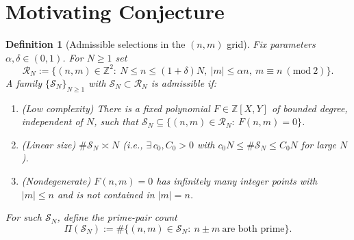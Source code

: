 \documentclass[11pt]{article}
\theoremstyle{inline}
\theoremstyle{break}
\theoremstyle{break}
\theoremstyle{break}
\theoremstyle{break}
\theoremstyle{break}
\theoremstyle{break}
\theoremstyle{break}
\newtheorem{definition}{Definition}
\theoremstyle{inline}
\begin{document}
\appendix
{}  %

\section{Motivating Conjecture}\label{app:motivation}

\begin{definition}[Admissible selections in the \( (n,m) \) grid]
\label{def:admissible}
Fix parameters \( \alpha,\delta\in(0,1) \). For \( N\ge 1 \) set
\begin{equation}
\mathcal{R}_N:=\{(n,m)\in\mathbb{Z}^2:\ N\le n\le (1+\delta)N,\ |m|\le \alpha n,\ m\equiv n \ (\mathrm{mod}\ 2)\}.
\end{equation}
A family \( \{\mathcal{S}_N\}_{N\ge 1} \) with \( \mathcal{S}_N\subset\mathcal{R}_N \) is \emph{admissible} if:
\begin{enumerate}
\item[(A1)] (\emph{Low complexity}) There is a fixed polynomial \( F\in\mathbb{Z}[X,Y] \) of bounded degree, independent of \( N \), such that
\( \mathcal{S}_N \subseteq \{(n,m)\in\mathcal{R}_N:\ F(n,m)=0\} \).
\item[(A2)] (\emph{Linear size}) \( \#\mathcal{S}_N \asymp N \) (i.e., \( \exists\,c_0,C_0>0 \) with \( c_0 N\le \#\mathcal{S}_N\le C_0 N \) for large \( N \)).
\item[(A3)] (\emph{Nondegenerate}) \( F(n,m)=0 \) has infinitely many integer points with \( |m|\le n \) and is not contained in \( |m|=n \).
\end{enumerate}
For such \( \mathcal{S}_N \), define the prime-pair count
\begin{equation}
\Pi(\mathcal{S}_N):=\#\{(n,m)\in\mathcal{S}_N:\ n\pm m\ \text{are both prime}\}.
\end{equation}
\end{definition}
\end{document}
